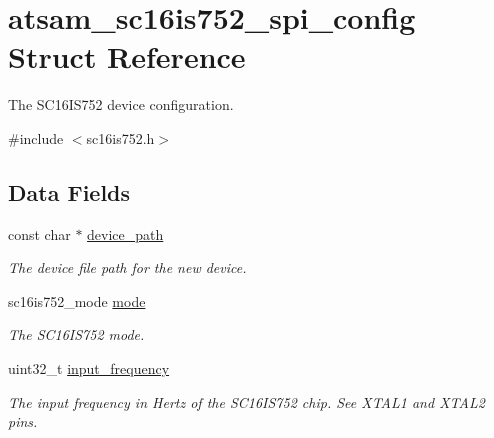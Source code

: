 \hypertarget{structatsam__sc16is752__spi__config}{}\section{atsam\+\_\+sc16is752\+\_\+spi\+\_\+config Struct Reference}
\label{structatsam__sc16is752__spi__config}


The S\+C16\+I\+S752 device configuration.  




{\ttfamily \#include $<$sc16is752.\+h$>$}

\subsection*{Data Fields}
\begin{DoxyCompactItemize}
\item 
\mbox{\label{structatsam__sc16is752__spi__config_ad626d8af6c22baea24f0da8f3aed02a0}} 
const char $\ast$ \mbox{\hyperlink{structatsam__sc16is752__spi__config_ad626d8af6c22baea24f0da8f3aed02a0}{device\+\_\+path}}
\begin{DoxyCompactList}\small\item\em The device file path for the new device. \end{DoxyCompactList}\item 
\mbox{\label{structatsam__sc16is752__spi__config_a54eacb76afd8aa1a5d3df9ad91bb1f12}} 
sc16is752\+\_\+mode \mbox{\hyperlink{structatsam__sc16is752__spi__config_a54eacb76afd8aa1a5d3df9ad91bb1f12}{mode}}
\begin{DoxyCompactList}\small\item\em The S\+C16\+I\+S752 mode. \end{DoxyCompactList}\item 
\mbox{\label{structatsam__sc16is752__spi__config_a421fbfbe70ddc68bb19cf317d4309233}} 
uint32\+\_\+t \mbox{\hyperlink{structatsam__sc16is752__spi__config_a421fbfbe70ddc68bb19cf317d4309233}{input\+\_\+frequency}}
\begin{DoxyCompactList}\small\item\em The input frequency in Hertz of the S\+C16\+I\+S752 chip. See X\+T\+A\+L1 and X\+T\+A\+L2 pins. \end{DoxyCompactList}\item 

\end{DoxyCompactItemize}
